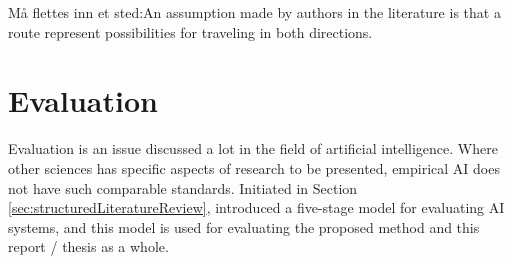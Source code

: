 Må flettes inn et sted:An assumption made by authors in the literature is that a route represent possibilities for traveling in both directions.

\section{Evaluation}


Evaluation is an issue discussed a lot in the field of artificial intelligence. Where other sciences has specific aspects of research to be presented, empirical AI does not have such comparable standards. Initiated in Section \vref{sec:structuredLiteratureReview},  \citet{cohen88} introduced a five-stage model for evaluating AI systems, and this model is used for evaluating the proposed method and this report / thesis as a whole. %

